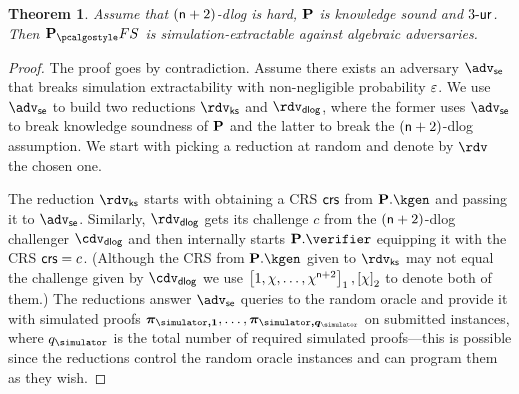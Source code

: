 \documentclass[runningheads,11pt]{llncs}
\let\spvec\vec
\let\vec\accentvec
\let\vec\spvec
\def\vec#1{\mathchoice{\mbox{\boldmath$\displaystyle#1$}}
	{\mbox{\boldmath$\textstyle#1$}}
	{\mbox{\boldmath$\scriptstyle#1$}}
	{\mbox{\boldmath$\scriptscriptstyle#1$}}}
\newtheorem{theorem}{Theorem}%
\theoremstyle{definition}
\begin{document}
\begin{theorem}
	Assume that $(\mathsf{n} + 2)$-dlog is hard, $\mathbf{P}$ is knowledge sound and ${3\text{-}\mathsf{ur}}$. 
	Then $\plonkprotfs$ is simulation-extractable against algebraic adversaries.
\end{theorem}
\begin{proof}
	The proof goes by contradiction. Assume there exists an adversary $\advse$ that breaks simulation extractability with non-negligible probability $\varepsilon$. 
	We use $\advse$ to build two reductions $\rdvks$ and $\rdvdlog$, where the former uses $\advse$ to break knowledge soundness of $\mathbf{P}$ and the latter to break the $(\mathsf{n} + 2)$-dlog assumption.
	We start with picking a reduction at random and denote by $\rdv$ the chosen one.
	
	The reduction $\rdvks$ starts with obtaining a CRS $\mathsf{crs}$ from $\plonkprot.\kgen$ and passing it to $\advse$. 
	Similarly, $\rdvdlog$ gets its challenge $c$ from the $(\mathsf{n} + 2)$-dlog challenger $\cdv_\dlog$ and then internally starts $\plonkprot.\verifier$ equipping it with the CRS $\mathsf{crs} = c$. (Although the CRS from $\plonkprot.\kgen$ given to $\rdvks$ may not equal the challenge given by $\cdv_\dlog$ we use $\left[1, \chi, \ldots, \chi^{\mathsf{n} + 2}\right]_{1}, \left[\chi\right]_{2}$ to denote both of them.)
	The reductions answer $\advse$ queries to the random oracle and provide it with simulated proofs $\vec{\zkproof_{\simulator, 1}}, \ldots, \vec{\zkproof_{\simulator, q_\simulator}}$ on submitted instances, where $q_\simulator$ is the total number of required simulated proofs---this is possible since the reductions control the random oracle instances and can program them as they wish.
	

\end{proof}
\end{document}
